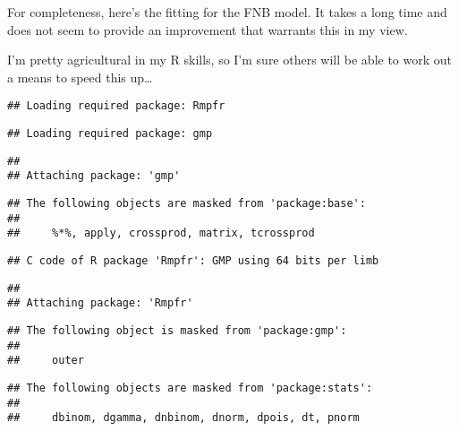 \documentclass[
]{article}
\newenvironment{Shaded}{\begin{snugshade}}{\end{snugshade}}
\newcommand{\AttributeTok}[1]{\textcolor[rgb]{0.77,0.63,0.00}{#1}}
\newcommand{\CommentTok}[1]{\textcolor[rgb]{0.56,0.35,0.01}{\textit{#1}}}
\newcommand{\DecValTok}[1]{\textcolor[rgb]{0.00,0.00,0.81}{#1}}
\newcommand{\FunctionTok}[1]{\textcolor[rgb]{0.00,0.00,0.00}{#1}}
\newcommand{\NormalTok}[1]{#1}
\newcommand{\OtherTok}[1]{\textcolor[rgb]{0.56,0.35,0.01}{#1}}
\newcommand{\SpecialCharTok}[1]{\textcolor[rgb]{0.00,0.00,0.00}{#1}}
\begin{document}
For completeness, here's the fitting for the FNB model. It takes a long
time and does not seem to provide an improvement that warrants this in
my view.

I'm pretty agricultural in my R skills, so I'm sure others will be able
to work out a means to speed this up\ldots{}

\begin{Shaded}
\end{Shaded}

\begin{verbatim}
## Loading required package: Rmpfr
\end{verbatim}

\begin{verbatim}
## Loading required package: gmp
\end{verbatim}

\begin{verbatim}
## 
## Attaching package: 'gmp'
\end{verbatim}

\begin{verbatim}
## The following objects are masked from 'package:base':
## 
##     %*%, apply, crossprod, matrix, tcrossprod
\end{verbatim}

\begin{verbatim}
## C code of R package 'Rmpfr': GMP using 64 bits per limb
\end{verbatim}

\begin{verbatim}
## 
## Attaching package: 'Rmpfr'
\end{verbatim}

\begin{verbatim}
## The following object is masked from 'package:gmp':
## 
##     outer
\end{verbatim}

\begin{verbatim}
## The following objects are masked from 'package:stats':
## 
##     dbinom, dgamma, dnbinom, dnorm, dpois, dt, pnorm
\end{verbatim}
\end{document}
